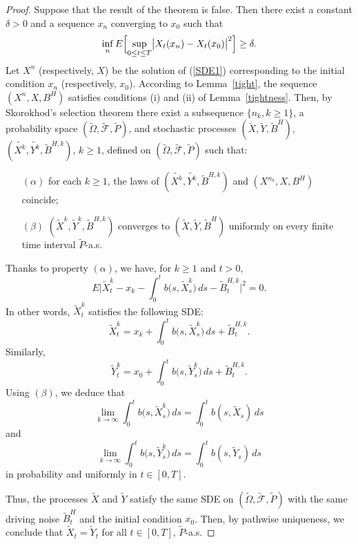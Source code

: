 \documentclass[numbers,compress,v1.0.1]{vmsta}
\theoremstyle{definition}
\newcommand{\rrvert}{\vert}
\newcommand{\llvert}{\vert}
\begin{document}
\begin{proof}
Suppose that the result of the theorem is false. Then there exist a
constant $\delta>0$ and a sequence $x_n$ converging to $x_0$ such that
%
\[
\inf_n E \Bigl[\sup_{0\leq t\leq T}\bigl\llvert
X_t (x_n)-X_t (x_0)\bigr\rrvert
^{2} \Bigr]\geq\delta.
\]
%
Let $X^n$ (respectively, $X$) be the solution of (\ref{SDE1})
corresponding to the initial condition $x_n$ (respectively, $x_0$).
According to Lemma~\ref{tight}, the sequence $(X^{n},X,B^H)$ satisfies
conditions (i) and (ii) of Lemma~\ref{tightness}. Then, by Skorokhod's
selection theorem there exist a subsequence $\{n_k,k\geq1 \}$, a
probability space $(\widetilde{\varOmega}, \widetilde{\mathcal
{F}},\widetilde{P})$, and stochastic processes $(\widetilde{X},
\widetilde{Y}, \widetilde{B}^H)$, $(\widetilde{X^{k}}, \widetilde
{Y^{k}},\widetilde{B}^{H,k})$, $k\geq1 $, defined on $(\widetilde
{\varOmega}, \widetilde{\mathcal{F}},\widetilde{P})$ such that:
%
\begin{itemize}
%
\item [$(\alpha)$] for each $k\geq1$, the laws of $(\widetilde
{X^{k}}, \widetilde{Y^{k}},\widetilde{B}^{H,k})$ and $({X^{n_k}},
X,B^H)$ coincide;
%
\item[$(\beta)$] $(\widetilde{X}^{k}, \widetilde{Y}^{k}, \widetilde
{B}^{H,k})$ converges to
$(\widetilde{X}, \widetilde{Y}, \widetilde{B}^H)$ uniformly on every
finite time interval $\widetilde{P}$-a.s.
\end{itemize}
%
Thanks to property $(\alpha)$, we have, for $k\geq1$ and $t>0$,
%
\[
E\Biggl\llvert \widetilde{X}^{k}_{t} -x_k -
\int_0^t b\bigl(s,\widetilde
{X}^{k}_{s}\bigr)\,ds - \widetilde{B}^{H,k}_t
\Biggr\rrvert ^{2}=0.
\]
%
In other words, $\widetilde{X}^{k}_{t}$ satisfies the following SDE:
%
\[
\widetilde{X}^{k}_t= x_k + \int
_0^t b\bigl(s,\widetilde{X}^{k}_{s}
\bigr)\,ds + \widetilde{B}^{H,k}_t .
\]
%
Similarly,
%
\[
\widetilde{Y}^{k}_t= x_0 + \int
_0^t b\bigl(s,\widetilde{Y}^{k}_{s}
\bigr)\,ds + \widetilde{B}^{H,k}_t .
\]
%
Using $(\beta)$, we deduce that
%
\[
\lim_{k \rightarrow\infty}\int_0^t b\bigl(s,
\widetilde{X}^{k}_{s}\bigr)\,ds=\int_0^t
b(s,\widetilde{X}_{s})\,ds
\]
%
and
%
\[
\lim_{k \rightarrow\infty}\int_0^t b\bigl(s,
\widetilde{Y}^{k}_{s}\bigr)\,ds=\int_0^t
b(s,\widetilde{Y}_{s})\,ds
\]
%
in probability and uniformly in $t \in[0, T]$.

Thus, the processes $\widetilde{X}$ and $\widetilde{Y}$ satisfy the same
SDE on $(\widetilde{\varOmega}, \widetilde{\mathcal{F}},\widetilde{P})$
with the same driving noise $\widetilde{B}^{H}_t$ and the initial
condition $x_0$. Then, by pathwise uniqueness, we conclude that
$\widetilde{X}_{t}=\widetilde{Y}_{t}$ for all $t \in[0, T]$,
$\widetilde{P}$-a.s.


\end{proof}
\end{document}
